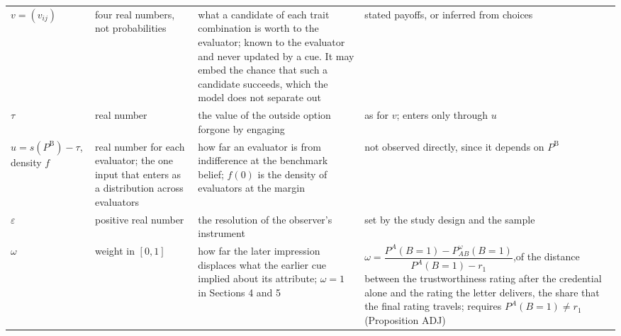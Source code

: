 \documentclass[11pt,a4paper]{article}
\newcommand{\PB}{P^{\mathrm{B}}}
\newcommand{\vv}{v}
\begin{document}
\begin{table}[htbp]
\begin{tabular}{@{}p{2.4cm}p{3.0cm}p{4.6cm}p{4.6cm}@{}}
\addlinespace
$\vv=(v_{ij})$ & four real numbers, not probabilities & what a candidate of each trait combination is worth to the evaluator; known to the evaluator and never updated by a cue. It may embed the chance that such a candidate succeeds, which the model does not separate out & stated payoffs, or inferred from choices\\
\addlinespace
$\tau$ & real number & the value of the outside option forgone by engaging & as for $\vv$; enters only through $u$\\
\addlinespace
$u=s(\PB)-\tau$, density $f$ & real number for each evaluator; the one input that enters as a distribution across evaluators & how far an evaluator is from indifference at the benchmark belief; $f(0)$ is the density of evaluators at the margin & not observed directly, since it depends on $\PB$\\
\addlinespace
$\varepsilon$ & positive real number & the resolution of the observer's instrument & set by the study design and the sample\\
\addlinespace
$\omega$ & weight in $[0,1]$ & how far the later impression displaces what the earlier cue implied about its attribute; $\omega=1$ in Sections 4 and 5 & $\omega=\dfrac{P^{A}(B{=}1)-P^{\omega}_{AB}(B{=}1)}{P^{A}(B{=}1)-r_1}$,\newline of the distance between the trustworthiness rating after the credential alone and the rating the letter delivers, the share that the final rating travels; requires $P^{A}(B{=}1)\neq r_1$ (Proposition ADJ)\\
\bottomrule
\end{tabular}
\end{table}
\end{document}
